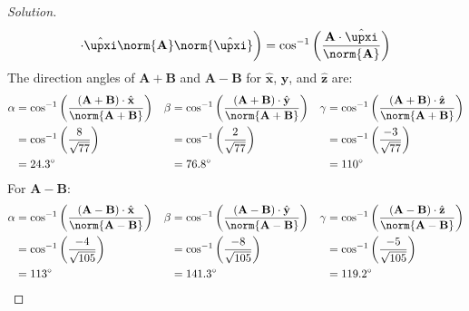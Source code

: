 \documentclass[crop=false,class=article,oneside]{standalone}
\begin{document}
\begin{proof}[Solution]
\begin{equation*}
{                    \cdot\hat{\boldsymbol{\upxi}}}
                    {\norm{\mathbf{A}}
                    \norm{\hat{\boldsymbol{\upxi}}}}
                \bigg)
                =\cos^{-1}\bigg(
                    \frac{\mathbf{A}
                    \cdot\hat{\boldsymbol{\upxi}}}
                    {\norm{\mathbf{A}}}
                \bigg)
            \end{equation*}
            The direction angles of $\mathbf{A}+\mathbf{B}$
            and $\mathbf{A}-\mathbf{B}$ for
            $\hat{\mathbf{x}}$, $\hat{\mathbf{y}}$,
            and $\hat{\mathbf{z}}$ are:
            \begin{align*}
                \alpha
                &=
                \cos^{-1}\bigg(
                    \frac{(\mathbf{A}+\mathbf{B})\cdot\hat{\mathbf{x}}}
                    {\norm{\mathbf{A+B}}}
                \bigg)
                &
                \beta
                &=\cos^{-1}\bigg(
                    \frac{(\mathbf{A}+\mathbf{B})\cdot \hat{\mathbf{y}}}
                    {\norm{\mathbf{A}+\mathbf{B}}}
                \bigg)
                &
                \gamma
                &=\cos^{-1}\bigg(
                    \frac{(\mathbf{A}+\mathbf{B})\cdot \hat{\mathbf{z}}}
                    {\norm{\mathbf{A}+\mathbf{B}}}
                \bigg)\\
                &=\cos^{-1}\bigg(\frac{8}{\sqrt{77}}\bigg)
                &
                &=\cos^{-1}\bigg(\frac{2}{\sqrt{77}}\bigg)&
                &=\cos^{-1}\bigg(\frac{-3}{\sqrt{77}}\bigg)\\
                &=24.3^{\circ}
                &
                &=76.8^{\circ}
                &
                &=110^{\circ}
            \end{align*}
            For $\mathbf{A}-\mathbf{B}$:
            \begin{align*}
                \alpha
                &=\cos^{-1}\bigg(
                    \frac{(\mathbf{A}-\mathbf{B})
                    \cdot\hat{\mathbf{x}}}
                    {\norm{\mathbf{A-B}}}
                \bigg)
                &
                \beta
                &=\cos^{-1}\bigg(
                \frac{(\mathbf{A}-\mathbf{B})
                \cdot\hat{\mathbf{y}}}
                    {\norm{\mathbf{A}-\mathbf{B}}}
                \bigg)
                &
                \gamma
                &=\cos^{-1}\bigg(
                    \frac{(\mathbf{A}-\mathbf{B})
                    \cdot\hat{\mathbf{z}}}
                    {\norm{\mathbf{A}-\mathbf{B}}}
                \bigg)\\
                &=
                \cos^{-1}\bigg(\frac{-4}{\sqrt{105}}\bigg)
                &
                &=\cos^{-1}\bigg(\frac{-8}{\sqrt{105}}\bigg)
                &
                &=\cos^{-1}\bigg(\frac{-5}{\sqrt{105}}\bigg)\\
                &=113^{\circ}
                &
                &=141.3^{\circ}
                &
                &=119.2^{\circ}
            \end{align*}
        \end{proof}
\end{document}
